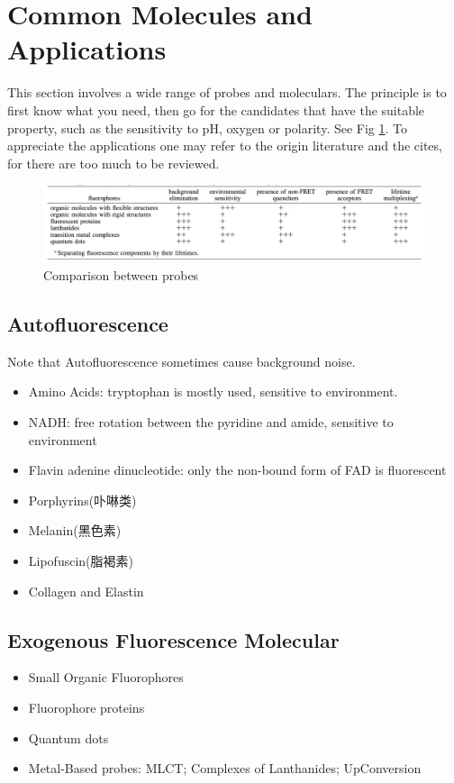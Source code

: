 \documentclass[12pt]{ctexart}
\begin{document}
\section{Common Molecules and Applications}
This section involves a wide range of probes and moleculars. The principle is to first know what you need, then go for the candidates that have the suitable property, such as the sensitivity to pH, oxygen or polarity. See Fig \ref{probes}. To appreciate the applications one may refer to the origin literature and the cites, for there are too much to be reviewed.
\begin{figure}[t]
    \centering
    \includegraphics[width=1.0\textwidth]{Probes.png}
    \caption{Comparison between probes}
    \label{probes}
\end{figure}
\subsection*{Autofluorescence}
Note that Autofluorescence sometimes cause background noise.
\begin{itemize}
    \item Amino Acids: tryptophan is mostly used, sensitive to environment.
    \item NADH: free rotation between the pyridine and amide, sensitive to environment
    \item Flavin adenine dinucleotide: only the non-bound form of FAD is fluorescent
    \item Porphyrins(卟啉类)
    \item Melanin(黑色素)
    \item Lipofuscin(脂褐素)
    \item Collagen and Elastin
\end{itemize}
\subsection*{Exogenous Fluorescence Molecular}
\begin{itemize}
    \item Small Organic Fluorophores
    \item Fluorophore proteins
    \item Quantum dots
    \item Metal-Based probes: MLCT; Complexes of Lanthanides; UpConversion
\end{itemize}
\end{document}
